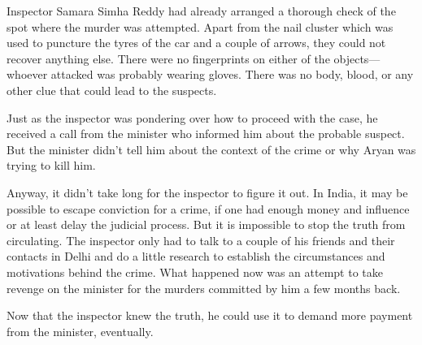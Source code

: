 Inspector Samara Simha Reddy had already arranged a thorough check of the
spot where the murder was attempted. Apart from the nail cluster which was used to
puncture the tyres of the car and a couple of arrows, they could not recover
anything else. There were no fingerprints on either of the objects—whoever
attacked was probably wearing gloves. There was no body, blood, or any other clue
that could lead to the suspects.

Just as the inspector was pondering over how to proceed with the case, he
received a call from the minister who informed him about the probable suspect.
But the minister didn't tell him about the context of the crime or why Aryan was
trying to kill him.

Anyway, it didn't take long for the inspector to figure it out. In India, it may
be possible to escape conviction for a crime, if one had enough money and
influence or at least delay the judicial process. But it is impossible to stop
the truth from circulating. The inspector only had to talk to a couple of his
friends and their contacts in Delhi and do a little research to establish the
circumstances and motivations behind the crime. What happened now was an attempt
to take revenge on the minister for the murders committed by him a few months
back.

Now that the inspector knew the truth, he
could use it to demand more payment from the minister, eventually.